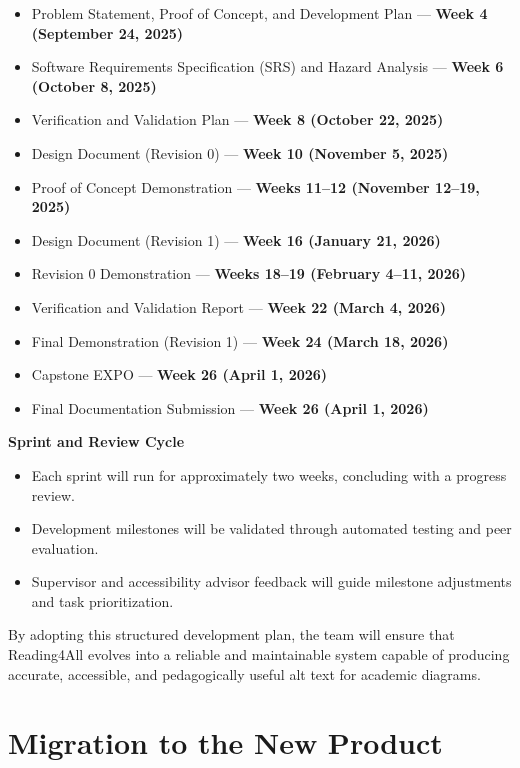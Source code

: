 \documentclass[12pt]{article}
\begin{document}
\begin{itemize}
    \item Problem Statement, Proof of Concept, and Development Plan — \textbf{Week 4 (September 24, 2025)}  
    \item Software Requirements Specification (SRS) and Hazard Analysis — \textbf{Week 6 (October 8, 2025)}  
    \item Verification and Validation Plan — \textbf{Week 8 (October 22, 2025)}  
    \item Design Document (Revision 0) — \textbf{Week 10 (November 5, 2025)}  
    \item Proof of Concept Demonstration — \textbf{Weeks 11–12 (November 12–19, 2025)}  
    \item Design Document (Revision 1) — \textbf{Week 16 (January 21, 2026)}  
    \item Revision 0 Demonstration — \textbf{Weeks 18–19 (February 4–11, 2026)}  
    \item Verification and Validation Report — \textbf{Week 22 (March 4, 2026)}  
    \item Final Demonstration (Revision 1) — \textbf{Week 24 (March 18, 2026)}  
    \item Capstone EXPO — \textbf{Week 26 (April 1, 2026)}  
    \item Final Documentation Submission — \textbf{Week 26 (April 1, 2026)}  
\end{itemize}

\textbf{Sprint and Review Cycle}
\begin{itemize}
    \item Each sprint will run for approximately two weeks, concluding with a progress review.  
    \item Development milestones will be validated through automated testing and peer evaluation.  
    \item Supervisor and accessibility advisor feedback will guide milestone adjustments and task prioritization.  
\end{itemize}

By adopting this structured development plan, the team will ensure that Reading4All evolves into a reliable and maintainable system capable of producing accurate, accessible, and pedagogically useful alt text for academic diagrams.


\section{Migration to the New Product}
\end{document}
